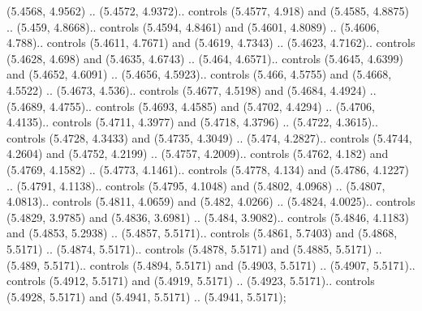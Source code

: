 (5.4568, 4.9562) .. (5.4572, 4.9372).. controls (5.4577, 4.918) and (5.4585, 4.8875) .. (5.459, 4.8668).. controls (5.4594, 4.8461) and (5.4601, 4.8089) .. (5.4606, 4.788).. controls (5.4611, 4.7671) and (5.4619, 4.7343) .. (5.4623, 4.7162).. controls (5.4628, 4.698) and (5.4635, 4.6743) .. (5.464, 4.6571).. controls (5.4645, 4.6399) and (5.4652, 4.6091) .. (5.4656, 4.5923).. controls (5.466, 4.5755) and (5.4668, 4.5522) .. (5.4673, 4.536).. controls (5.4677, 4.5198) and (5.4684, 4.4924) .. (5.4689, 4.4755).. controls (5.4693, 4.4585) and (5.4702, 4.4294) .. (5.4706, 4.4135).. controls (5.4711, 4.3977) and (5.4718, 4.3796) .. (5.4722, 4.3615).. controls (5.4728, 4.3433) and (5.4735, 4.3049) .. (5.474, 4.2827).. controls (5.4744, 4.2604) and (5.4752, 4.2199) .. (5.4757, 4.2009).. controls (5.4762, 4.182) and (5.4769, 4.1582) .. (5.4773, 4.1461).. controls (5.4778, 4.134) and (5.4786, 4.1227) .. (5.4791, 4.1138).. controls (5.4795, 4.1048) and (5.4802, 4.0968) .. (5.4807, 4.0813).. controls (5.4811, 4.0659) and (5.482, 4.0266) .. (5.4824, 4.0025).. controls (5.4829, 3.9785) and (5.4836, 3.6981) .. (5.484, 3.9082).. controls (5.4846, 4.1183) and (5.4853, 5.2938) .. (5.4857, 5.5171).. controls (5.4861, 5.7403) and (5.4868, 5.5171) .. (5.4874, 5.5171).. controls (5.4878, 5.5171) and (5.4885, 5.5171) .. (5.489, 5.5171).. controls (5.4894, 5.5171) and (5.4903, 5.5171) .. (5.4907, 5.5171).. controls (5.4912, 5.5171) and (5.4919, 5.5171) .. (5.4923, 5.5171).. controls (5.4928, 5.5171) and (5.4941, 5.5171) .. (5.4941, 5.5171);



